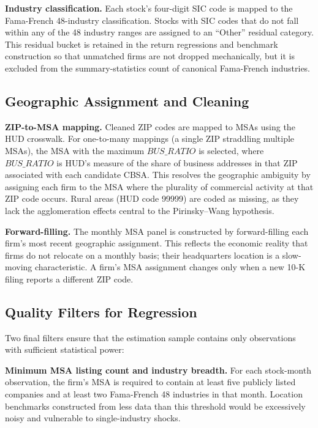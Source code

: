 \documentclass[
  12pt,
]{article}
\begin{document}
\textbf{Industry classification.} Each stock's four-digit SIC code is
mapped to the Fama-French 48-industry classification. Stocks with SIC
codes that do not fall within any of the 48 industry ranges are assigned
to an ``Other'' residual category. This residual bucket is retained in
the return regressions and benchmark construction so that unmatched
firms are not dropped mechanically, but it is excluded from the
summary-statistics count of canonical Fama-French industries.

\subsection{Geographic Assignment and
Cleaning}\label{geographic-assignment-and-cleaning}

\textbf{ZIP-to-MSA mapping.} Cleaned ZIP codes are mapped to MSAs using
the HUD crosswalk. For one-to-many mappings (a single ZIP straddling
multiple MSAs), the MSA with the maximum \(BUS\_RATIO\) is selected,
where \(BUS\_RATIO\) is HUD's measure of the share of business addresses
in that ZIP associated with each candidate CBSA. This resolves the
geographic ambiguity by assigning each firm to the MSA where the
plurality of commercial activity at that ZIP code occurs. Rural areas
(HUD code 99999) are coded as missing, as they lack the agglomeration
effects central to the Pirinsky--Wang hypothesis.

\textbf{Forward-filling.} The monthly MSA panel is constructed by
forward-filling each firm's most recent geographic assignment. This
reflects the economic reality that firms do not relocate on a monthly
basis; their headquarters location is a slow-moving characteristic. A
firm's MSA assignment changes only when a new 10-K filing reports a
different ZIP code.

\subsection{Quality Filters for
Regression}\label{quality-filters-for-regression}

Two final filters ensure that the estimation sample contains only
observations with sufficient statistical power:

\textbf{Minimum MSA listing count and industry breadth.} For each
stock-month observation, the firm's MSA is required to contain at least
five publicly listed companies and at least two Fama-French 48
industries in that month. Location benchmarks constructed from less data
than this threshold would be excessively noisy and vulnerable to
single-industry shocks.
\end{document}
